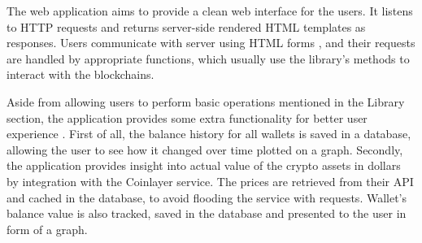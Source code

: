 The web application aims to provide a clean web interface for the users.
It listens to HTTP requests and returns server-side rendered HTML \cite{html} templates as responses.
Users communicate with server using HTML forms \cite{html-forms}, and their requests are handled by appropriate functions,
which usually use the library's methods to interact with the blockchains.

Aside from allowing users to perform basic operations mentioned in the Library section,
the application provides some extra functionality for better user experience \cite{ux}.
First of all, the balance history for all wallets is saved in a database,
allowing the user to see how it changed over time plotted on a graph.
Secondly, the application provides insight into actual value of the crypto assets in dollars
by integration with the Coinlayer \cite{coinlayer} service.
The prices are retrieved from their API \cite{api}
and cached in the database, to avoid flooding the service with requests.
Wallet's balance value is also tracked, saved in the database and
presented to the user in form of a graph.
